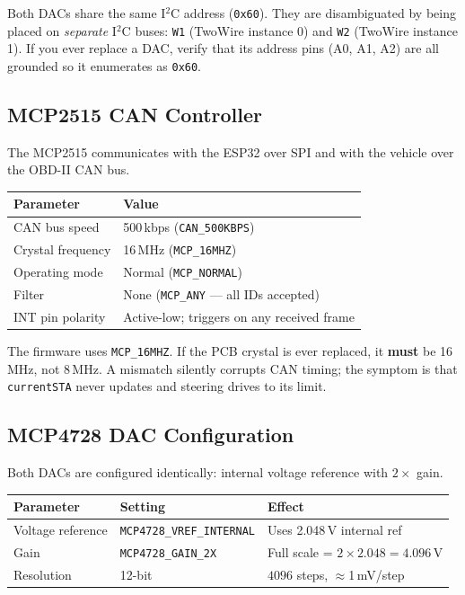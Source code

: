 \documentclass[12pt, letterpaper]{article}
\begin{document}
\begin{notebox}
Both DACs share the same I$^2$C address (\texttt{0x60}).  They are disambiguated
by being placed on \emph{separate} I$^2$C buses: \texttt{W1} (TwoWire instance 0)
and \texttt{W2} (TwoWire instance 1).  If you ever replace a DAC, verify that its
address pins (A0, A1, A2) are all grounded so it enumerates as \texttt{0x60}.
\end{notebox}

\subsection{MCP2515 CAN Controller}

The MCP2515 communicates with the ESP32 over SPI and with the vehicle over the
OBD-II CAN bus.

\begin{center}
\begin{tabular}{ll}
  \toprule
  \textbf{Parameter} & \textbf{Value} \\
  \midrule
  CAN bus speed    & 500\,kbps (\texttt{CAN\_500KBPS}) \\
  Crystal frequency & 16\,MHz (\texttt{MCP\_16MHZ}) \\
  Operating mode   & Normal (\texttt{MCP\_NORMAL}) \\
  Filter           & None (\texttt{MCP\_ANY} --- all IDs accepted) \\
  INT pin polarity & Active-low; triggers on any received frame \\
  \bottomrule
\end{tabular}
\end{center}

\begin{warningbox}
The firmware uses \texttt{MCP\_16MHZ}.  If the PCB crystal is ever replaced, it
\textbf{must} be 16\,MHz, not 8\,MHz.  A mismatch silently corrupts CAN timing;
the symptom is that \texttt{currentSTA} never updates and steering drives to its
limit.
\end{warningbox}

\subsection{MCP4728 DAC Configuration}

Both DACs are configured identically: internal voltage reference with $2\times$ gain.

\begin{center}
\begin{tabular}{lll}
  \toprule
  \textbf{Parameter} & \textbf{Setting} & \textbf{Effect} \\
  \midrule
  Voltage reference & \texttt{MCP4728\_VREF\_INTERNAL} & Uses 2.048\,V internal ref \\
  Gain              & \texttt{MCP4728\_GAIN\_2X}        & Full scale = $2\times2.048 = 4.096$\,V \\
  Resolution        & 12-bit                             & $4096$ steps, $\approx$1\,mV/step \\
  \bottomrule
\end{tabular}
\end{center}
\end{document}
